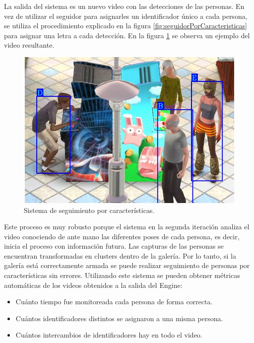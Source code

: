 La salida del sistema es un nuevo video con las detecciones de las personas. En vez de utilizar el seguidor para asignarles un identificador único a cada persona, se utiliza el procedimiento explicado en la figura \ref{fig:seguidorPorCaracteristicas} para asignar una letra a cada detección. En la figura \ref{fig:videoPorCaracteristicas} se observa un ejemplo del video resultante.

\begin{figure}[ht]
	\centering
	\includegraphics[scale=.60]{./Figures/videoPorCaracteristicas.jpg}
	\caption{Sistema de seguimiento por características.}
	\label{fig:videoPorCaracteristicas}
\end{figure}

Este proceso es muy robusto porque el sistema en la segunda iteración analiza el video conociendo de ante mano las diferentes poses de cada persona, es decir, inicia el proceso con información futura. Las capturas de las personas se encuentran transformadas en clusters dentro de la galería. Por lo tanto, si la galería está correctamente armada se puede realizar seguimiento de personas por características sin errores. Utilizando este sistema se pueden obtener métricas automáticas de los videos obtenidos a la salida del Engine:
\begin{itemize}
\item Cuánto tiempo fue monitoreada cada persona de forma correcta.
\item Cuántos identificadores distintos se asignaron a una misma persona.
\item Cuántos intercambios de identificadores hay en todo el video.
\end{itemize}


